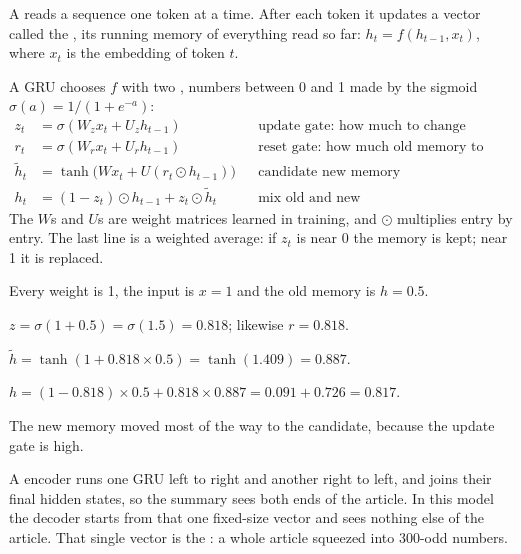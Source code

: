\begin{definition}
A  reads a sequence one token at a time. After each token it updates a vector called the , its running memory of everything read so far: $h_t = f(h_{t-1}, x_t)$, where $x_t$ is the embedding of token $t$.
\end{definition}

\begin{definition}
A GRU chooses $f$ with two , numbers between 0 and 1 made by the sigmoid $\sigma(a) = 1/(1 + e^{-a})$:
\[
\begin{aligned}
z_t &= \sigma(W_z x_t + U_z h_{t-1}) && \text{update gate: how much to change}\\
r_t &= \sigma(W_r x_t + U_r h_{t-1}) && \text{reset gate: how much old memory to use}\\
\tilde h_t &= \tanh\bigl(W x_t + U (r_t \odot h_{t-1})\bigr) && \text{candidate new memory}\\
h_t &= (1 - z_t) \odot h_{t-1} + z_t \odot \tilde h_t && \text{mix old and new}
\end{aligned}
\]
The $W$s and $U$s are weight matrices learned in training, and $\odot$ multiplies entry by entry. The last line is a weighted average: if $z_t$ is near 0 the memory is kept; near 1 it is replaced.
\end{definition}

\begin{example}
Every weight is 1, the input is $x = 1$ and the old memory is $h = 0.5$.
\begin{steps}
  \item $z = \sigma(1 + 0.5) = \sigma(1.5) = 0.818$; likewise $r = 0.818$.
  \item $\tilde h = \tanh(1 + 0.818 \times 0.5) = \tanh(1.409) = 0.887$.
  \item $h = (1 - 0.818) \times 0.5 + 0.818 \times 0.887 = 0.091 + 0.726 = 0.817$.
\end{steps}
The new memory moved most of the way to the candidate, because the update gate is high.
\end{example}

\begin{definition}
A  encoder runs one GRU left to right and another right to left, and joins their final hidden states, so the summary sees both ends of the article. In this model the decoder starts from that one fixed-size vector and sees nothing else of the article. That single vector is the : a whole article squeezed into 300-odd numbers.
\end{definition}

